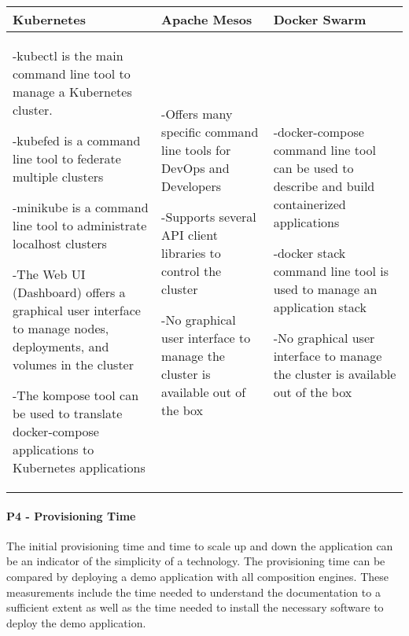 \begin{center}
  \begin{tabular}{ | p{4.5cm} | p{4.5cm} | p{4.5cm} | }
  	\hline
    \textbf{Kubernetes}&\textbf{Apache Mesos}&\textbf{Docker Swarm}\\\hline
    -kubectl is the main command line tool to manage a Kubernetes cluster.
    
    -kubefed is a command line tool to federate multiple clusters

	-minikube is a command line tool to administrate localhost clusters
    
    -The Web UI (Dashboard) offers a graphical user interface to manage nodes,
    deployments, and volumes in the cluster 
    
    -The kompose tool can be used to translate docker-compose applications to
    Kubernetes applications&
    
    -Offers many specific command line tools for DevOps and Developers
    
    -Supports several API client libraries to control the cluster 
    
    -No graphical user interface to manage the cluster is available out of the
    box&
    
    -docker-compose command line tool  can be used to describe and build
    containerized applications
    
    -docker stack command line tool is used to manage an application stack 
    
    -No graphical user interface to manage the cluster is available out of the
    box\\
    
    \hline
  \end{tabular}
\end{center}

\paragraph{P4 - Provisioning Time}

The initial provisioning time and time to scale up and down the application can
be an indicator of the simplicity of a technology. The provisioning time can be
compared by deploying a demo application with all composition engines.
These measurements include the time needed to understand the documentation to a
sufficient extent as well as the time needed to install the necessary software
to deploy the demo application.

